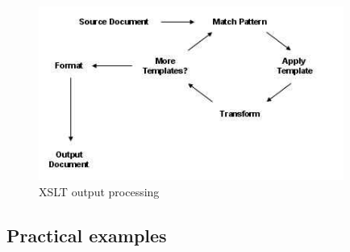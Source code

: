  

\vspace{0.5cm}
\begin{figure}[H]
  \centering
    \includegraphics[width=10cm]{images/xslt-processing.jpg}
  \caption{XSLT output processing}
  \label{fig:xslt-processing}
\end{figure}
\vspace{0.5cm}


\subsection{Practical examples}




